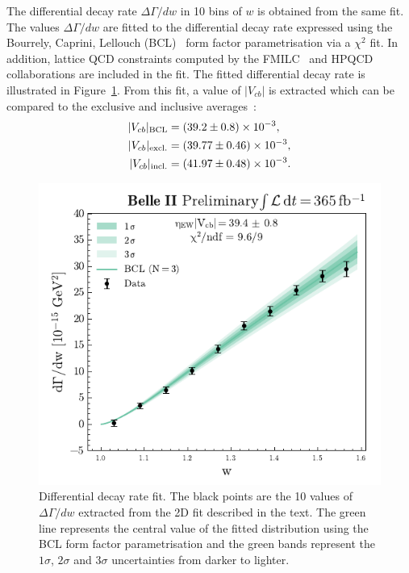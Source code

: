\documentclass{moriond}
\def\bea{\begin{eqnarray}}
\def\eea{\end{eqnarray}}
\def\vcb{V_{cb}}
\begin{document}
The differential decay rate $\Delta\Gamma/dw$ in 10 bins of $w$ is obtained from the same fit. The values $\Delta\Gamma/dw$ are fitted to the differential decay rate expressed using the Bourrely, Caprini, Lellouch (BCL)~\cite{bcl} form factor parametrisation via a $\chi^2$ fit. In addition, lattice QCD constraints computed by the FMILC~\cite{fmilc} and HPQCD~\cite{hpqcd} collaborations are included in the fit. The fitted differential decay rate is illustrated in Figure~\ref{fig:bcl_fit}. From this fit, a value of $|\vcb|$ is extracted which can be compared to the exclusive and inclusive averages~\cite{hflav}:
\bea
    |\vcb|_{\rm BCL} &= (39.2 \pm 0.8) \times 10^{-3}, \\
    |\vcb|_{\rm excl.} &= (39.77 \pm 0.46) \times 10^{-3}, \\
    |\vcb|_{\rm incl.} &= (41.97 \pm 0.48) \times 10^{-3}.
\eea

\begin{figure}[h!]
    \centering
    \includegraphics[scale=0.9]{bcl_fit.pdf}
    \caption{Differential decay rate fit. The black points are the 10 values of $\Delta\Gamma/dw$ extracted from the 2D fit described in the text. The green line represents the central value of the fitted distribution using the BCL form factor parametrisation and the green bands represent the $1\sigma$, $2\sigma$ and $3\sigma$ uncertainties from darker to lighter.}
    \label{fig:bcl_fit}
\end{figure}
\end{document}
